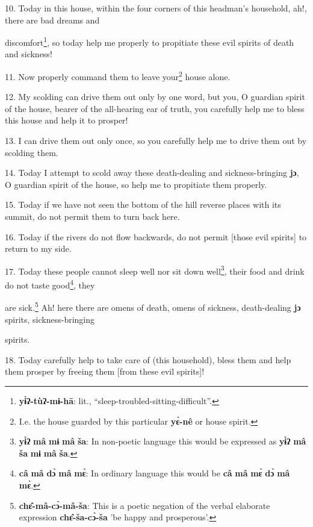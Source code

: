 10. Today in this house, within the four corners of this headman's household, ah!,
there are bad dreams and

discomfort\footnote{\textbf{yɨ̀ʔ-tùʔ-mɨ-hā}: lit., ``sleep-troubled-sitting-difficult''.}, so today help me properly to propitiate these evil spirits of death
and sickness!

11. Now properly command them to leave your\footnote{I.e. the house guarded by this particular \textbf{yɛ̀-nê} or house spirit.} house alone.

12. My scolding can drive them out only by one word, but you, O guardian spirit
of the house, bearer of the all-hearing ear of truth, you carefully help me to
bless this house and help it to prosper!

13. I can drive them out only once, so you carefully help me to drive them out
by scolding them.

14. Today I attempt to scold away these death-dealing and\textbf{ }sickness-bringing\textbf{
jɔ}, O guardian spirit of the house, so help me to propitiate them properly.

15. Today if we have not seen the bottom of the hill reverse places with its summit,
do not permit them to turn back here.

16. Today if the rivers do not flow backwards, do not permit [those evil spirits]
to return to my side.

17. Today these people cannot sleep well nor sit down well\footnote{\textbf{yɨ̀ʔ} \textbf{mâ} \textbf{mɨ} \textbf{mâ} \textbf{ša}: In non-poetic language this would be expressed as \textbf{yɨ̀ʔ} \textbf{mâ} \textbf{ša} \textbf{mɨ} \textbf{mâ} \textbf{ša}.}, their food and
drink do not taste good\footnote{\textbf{câ} \textbf{mâ} \textbf{dɔ̀} \textbf{mâ} \textbf{mɛ̀}: In ordinary language this would be \textbf{câ} \textbf{mâ} \textbf{mɛ̀} \textbf{dɔ̀} \textbf{mâ} \textbf{mɛ̀}.}, they

are sick.\footnote{\textbf{chɛ̂-mâ-cɔ̀-mâ-ša}: This is a poetic negation of the verbal elaborate expression \textbf{chɛ̂-ša-cɔ̀-ša} 'be happy and prosperous'.} Ah! here there are omens of death, omens of sickness, death-dealing
\textbf{jɔ} spirits, sickness-bringing

spirits.

18. Today carefully help to take care of (this household), bless them and help them
prosper by freeing them [from these evil spirits]!

